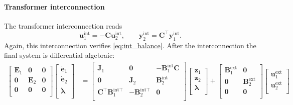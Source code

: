 \paragraph{Transformer interconnection}
The transformer interconnection reads
\begin{equation*}
\mathbf{u}_1^{\text{int}} = -\mathbf{C} \mathbf{u}_2^{\text{int}}, \qquad
\mathbf{y}_2^{\text{int}} = \mathbf{C}^\top \mathbf{y}_1^{\text{int}}.
\end{equation*}
Again, this interconnection verifies \eqref{eq:int_balance}. After the interconnection the final system is differential algebraic:
\begin{align*}
\begin{bmatrix}
\mathbf{E}_1 & \mathbf{0} & \mathbf{0} \\ 
\mathbf{0} & \mathbf{E}_2 & \mathbf{0} \\
\mathbf{0} & \mathbf{0} & \mathbf{0} \\
\end{bmatrix}
\begin{bmatrix}
\dot{\mathbf{e}}_1 \\ \dot{\mathbf{e}}_2 \\ \dot{\bm{\lambda}} \\
\end{bmatrix} &= 
\begin{bmatrix}
\mathbf{J}_1 & \mathbf{0} & -\mathbf{B}_1^{\text{int}} \mathbf{C} \\ 
\mathbf{0} & \mathbf{J}_2 & \mathbf{B}_2^{\text{int}} \\
\mathbf{C}^\top \mathbf{B}_1^{\text{int} \top} & - \mathbf{B}_2^{\text{int} \top} & \mathbf{0} \\
\end{bmatrix}
\begin{bmatrix}
\mathbf{z}_1 \\ 
\mathbf{z}_2 \\
\bm{\lambda} \\
\end{bmatrix}+ 
\begin{bmatrix}
\mathbf{B}_1^{\text{ext}} & \mathbf{0} \\
\mathbf{0} & \mathbf{B}_2^{\text{ext}} \\
\mathbf{0} & \mathbf{0} \\
\end{bmatrix} 
\begin{bmatrix}
\mathbf{u}_1^{\text{ext}} \\ 
\mathbf{u}_2^{\text{ext}} \\

\end{bmatrix}
\end{align*}
